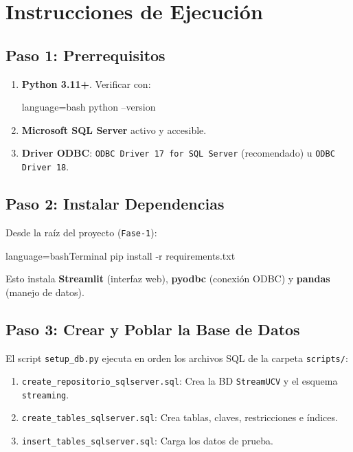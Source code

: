 \documentclass[11pt,a4paper]{article}
\begin{document}
\newpage

\section{Instrucciones de Ejecución}

\subsection{Paso 1: Prerrequisitos}
\begin{enumerate}
    \item \textbf{Python 3.11+}. Verificar con:
    \begin{codeblock}{language=bash}
python --version
    \end{codeblock}
    \item \textbf{Microsoft SQL Server} activo y accesible.
    \item \textbf{Driver ODBC}: \texttt{ODBC Driver 17 for SQL Server} (recomendado) u \texttt{ODBC Driver 18}.
\end{enumerate}

\subsection{Paso 2: Instalar Dependencias}
Desde la raíz del proyecto (\texttt{Fase-1}):
\begin{codeblocklang}{language=bash}{Terminal}
pip install -r requirements.txt
\end{codeblocklang}
Esto instala \textbf{Streamlit} (interfaz web), \textbf{pyodbc} (conexión ODBC) y \textbf{pandas} (manejo de datos).

\subsection{Paso 3: Crear y Poblar la Base de Datos}
El script \texttt{setup\_db.py} ejecuta en orden los archivos SQL de la carpeta \texttt{scripts/}:
\begin{enumerate}
    \item \texttt{create\_repositorio\_sqlserver.sql}: Crea la BD \texttt{StreamUCV} y el esquema \texttt{streaming}.
    \item \texttt{create\_tables\_sqlserver.sql}: Crea tablas, claves, restricciones e índices.
    \item \texttt{insert\_tables\_sqlserver.sql}: Carga los datos de prueba.
\end{enumerate}
\end{document}

